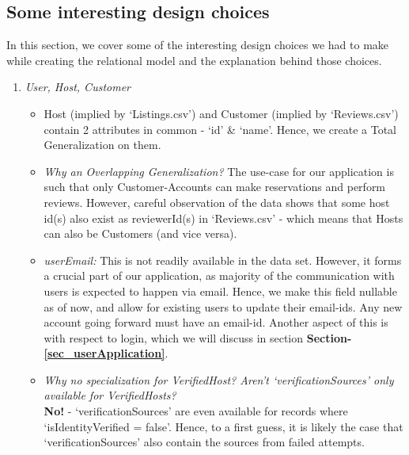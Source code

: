 \documentclass[conference]{IEEEtran}
\begin{document}
\subsection{\textbf{Some interesting design choices}}
    In this section, we cover some of the interesting design choices we had to make while creating the relational model and the explanation behind those choices.
    \begin{enumerate}
        \item \textit{User, Host, Customer}
    	    \begin{itemize}
                \item Host (implied by ‘Listings.csv’\cite{1_Airbnb}) and Customer (implied by ‘Reviews.csv’\cite{1_Airbnb}) contain 2 attributes in common - ‘id’ \& ‘name’. Hence, we create a Total Generalization on them.
                
                \vspace{1mm}
                
                \item  \textit{Why an Overlapping Generalization?}  The use-case for our application is such that only Customer-Accounts can make reservations and perform reviews. However, careful observation of the data shows that some host id(s) also exist as reviewerId(s) in ‘Reviews.csv’\cite{1_Airbnb} -  which means that Hosts can also be Customers (and vice versa).
                
                \vspace{1mm}
                
                \item \textit{userEmail:} This is not readily available in the data set. However, it forms a crucial part of our application, as majority of the communication with users is expected to happen via email.
                Hence, we make this field nullable as of now, and allow for existing users to update their email-ids. Any new account going forward must have an email-id. Another aspect of this is with respect to login, which we will discuss in section \textbf{\color{red} \textbf{Section-\ref{sec_userApplication}}}.
                
                \vspace{1mm}
                
                \item \textit{Why no specialization for VerifiedHost?  Aren’t ‘verificationSources’ only available for VerifiedHosts?}\\
                    \textbf{\color{green}No!} - ‘verificationSources’ are even available for records where ‘isIdentityVerified = false’. Hence, to a first guess, it is likely the case that ‘verificationSources’ also contain the sources from failed attempts.


\end{itemize}
\end{enumerate}
\end{document}
